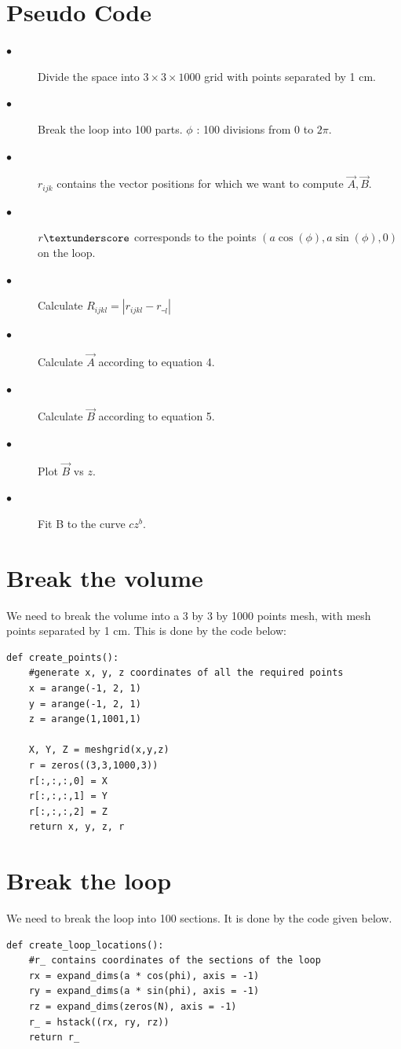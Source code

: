 \documentclass[11pt, a4paper]{article}
\begin{document}
\section{Pseudo Code}
\begin{description}
\item[$\bullet$]Divide the space into $3 \times 3 \times 1000$ grid with points separated by 1 cm. \\
\item[$\bullet$]Break the loop into 100 parts. $\phi$ : 100 divisions from 0 to $2\pi$.\\
\item[$\bullet$]$r_{ijk}$ contains the vector positions for which we want to compute $\vec{A}, \vec{B}$.\\
\item[$\bullet$]$r\textunderscore$ corresponds to the points $(a\cos(\phi), a\sin(\phi), 0)$ on the loop.\\
\item[$\bullet$]Calculate $R_{ijkl} = |r_{ijkl} - r\__{l}|$\\
\item[$\bullet$]Calculate $\vec{A}$ according to equation 4.\\
\item[$\bullet$]Calculate $\vec{B}$ according to equation 5.\\
\item[$\bullet$]Plot $\vec{B}$ vs $z$.
\item[$\bullet$]Fit B to the curve $cz^b$.
\end{description}

\section{Break the volume}
We need to break the volume into a 3 by 3 by 1000 points mesh, with mesh points separated by 1 cm.
This is done by the code below:
\begin{lstlisting}	
def create_points():
	#generate x, y, z coordinates of all the required points
	x = arange(-1, 2, 1)
	y = arange(-1, 2, 1)
	z = arange(1,1001,1)

	X, Y, Z = meshgrid(x,y,z)
	r = zeros((3,3,1000,3))
	r[:,:,:,0] = X
	r[:,:,:,1] = Y
	r[:,:,:,2] = Z
	return x, y, z, r
\end{lstlisting}

\section{Break the loop}
We need to break the loop into 100 sections. It is done by the code given below.
\begin{lstlisting}
def create_loop_locations():
	#r_ contains coordinates of the sections of the loop 
	rx = expand_dims(a * cos(phi), axis = -1)
	ry = expand_dims(a * sin(phi), axis = -1)
	rz = expand_dims(zeros(N), axis = -1)
	r_ = hstack((rx, ry, rz))
	return r_
\end{lstlisting}
\end{document}
